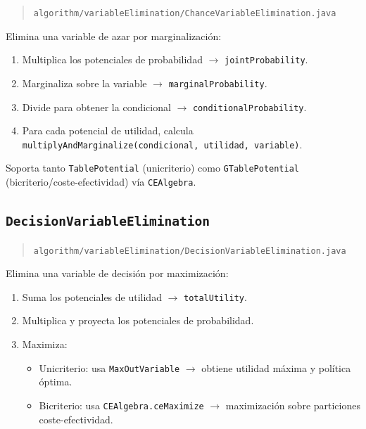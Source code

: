 \documentclass[11pt,a4paper]{article}
\newcommand{\clase}[1]{\texttt{#1}}
\begin{document}
\begin{quote}
\texttt{algorithm/variableElimination/ChanceVariableElimination.java}
\end{quote}

Elimina una variable de azar por marginalizaci\'{o}n:

\begin{enumerate}
  \item Multiplica los potenciales de probabilidad $\rightarrow$ \texttt{jointProbability}.
  \item Marginaliza sobre la variable $\rightarrow$ \texttt{marginalProbability}.
  \item Divide para obtener la condicional $\rightarrow$ \texttt{conditionalProbability}.
  \item Para cada potencial de utilidad, calcula
        \texttt{multiplyAndMarginalize(condicional, utilidad, variable)}.
\end{enumerate}

Soporta tanto \clase{TablePotential} (unicriterio) como \clase{GTablePotential}
(bicriterio/coste-efectividad) v\'{i}a \clase{CEAlgebra}.

\subsection{\clase{DecisionVariableElimination}}

\begin{quote}
\texttt{algorithm/variableElimination/DecisionVariableElimination.java}
\end{quote}

Elimina una variable de decisi\'{o}n por maximizaci\'{o}n:

\begin{enumerate}
  \item Suma los potenciales de utilidad $\rightarrow$ \texttt{totalUtility}.
  \item Multiplica y proyecta los potenciales de probabilidad.
  \item Maximiza:
    \begin{itemize}
      \item Unicriterio: usa \clase{MaxOutVariable} $\rightarrow$ obtiene
            utilidad m\'{a}xima y pol\'{i}tica \'{o}ptima.
      \item Bicriterio: usa \clase{CEAlgebra.ceMaximize} $\rightarrow$
            maximizaci\'{o}n sobre particiones coste-efectividad.
    \end{itemize}
\end{enumerate}
\end{document}
